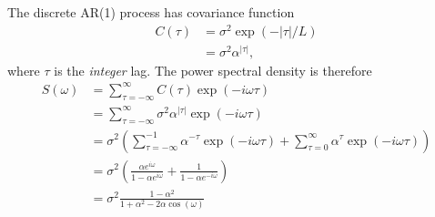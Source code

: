 \documentclass[a4paper, 12pt]{article}
\begin{document}
The discrete AR(1) process has covariance function
\begin{align}
C(\tau) &= \sigma^2 \exp\left(-|\tau| / L\right) \\
        &= \sigma^2 \alpha^{|\tau|},
\end{align}
where $\tau$ is the {\em integer} lag.
The power spectral density is therefore
\begin{align}
S(\omega) &= \sum_{\tau=-\infty}^{\infty} C(\tau)\exp(-i \omega \tau) \\
          &= \sum_{\tau=-\infty}^{\infty} \sigma^2 \alpha^{|\tau|}
                                         \exp(-i \omega \tau) \\
          &= \sigma^2 \left(
                \sum_{\tau=-\infty}^{-1} \alpha^{-\tau}\exp(-i \omega \tau) + 
                \sum_{\tau=0}^{\infty} \alpha^{\tau}\exp(-i \omega \tau)
                        \right) \\
          &= \sigma^2 \left(
                \frac{\alpha e^{i\omega}}
                     {1 - \alpha e^{i\omega}}
                 +
                \frac{1}
                     {1 - \alpha e^{-i\omega}}
                        \right) \\
         &= \sigma^2
                \frac{1 - \alpha^2}
                     {1 + \alpha^2 - 2\alpha\cos(\omega)}
\end{align}
\end{document}
